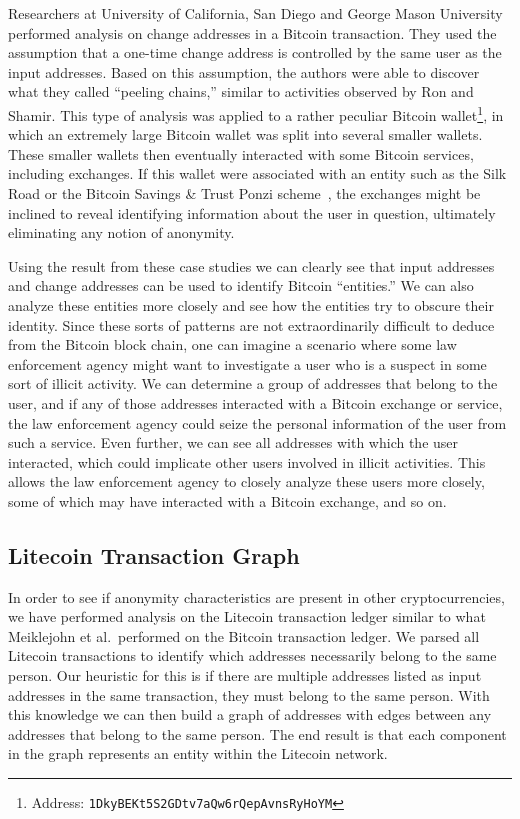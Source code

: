 \documentclass[11pt]{article}
\begin{document}
Researchers at University of California, San Diego and George Mason University~\cite{meiklejohn13} performed analysis on
change addresses in a Bitcoin transaction. They used the assumption that a one-time change address is controlled by the
same user as the input addresses. Based on this assumption, the authors were able to discover what they called ``peeling
chains,'' similar to activities observed by Ron and Shamir. This type of analysis was applied to a rather peculiar
Bitcoin wallet\footnote{Address: {\tt 1DkyBEKt5S2GDtv7aQw6rQepAvnsRyHoYM}}, in which an extremely large Bitcoin wallet
was split into several smaller wallets. These smaller wallets then eventually interacted with some Bitcoin services,
including exchanges. If this wallet were associated with an entity such as the Silk Road or the Bitcoin Savings \& Trust
Ponzi scheme~\cite{moore13}, the exchanges might be inclined to reveal identifying information about the user in
question, ultimately eliminating any notion of anonymity.

Using the result from these case studies we can clearly see that input addresses and change addresses can be used to
identify Bitcoin ``entities.'' We can also analyze these entities more closely and see how the entities try to obscure
their identity. Since these sorts of patterns are not extraordinarily difficult to deduce from the Bitcoin block chain,
one can imagine a scenario where some law enforcement agency might want to investigate a user who is a suspect in some
sort of illicit activity. We can determine a group of addresses that belong to the user, and if any of those addresses
interacted with a Bitcoin exchange or service, the law enforcement agency could seize the personal information of the
user from such a service. Even further, we can see all addresses with which the user interacted, which could implicate
other users involved in illicit activities. This allows the law enforcement agency to closely analyze these users more
closely, some of which may have interacted with a Bitcoin exchange, and so on.

\subsection{Litecoin Transaction Graph} In order to see if anonymity characteristics are present in other
cryptocurrencies, we have performed analysis on the Litecoin transaction ledger similar to what Meiklejohn et al.\
performed on the Bitcoin transaction ledger\cite{meiklejohn13}. We parsed all Litecoin transactions to identify which
addresses necessarily belong to the same person. Our heuristic for this is if there are multiple addresses listed as
input addresses in the same transaction, they must belong to the same person. With this knowledge we can then build a
graph of addresses with edges between any addresses that belong to the same person. The end result is that each
component in the graph represents an entity within the Litecoin network.
\end{document}
